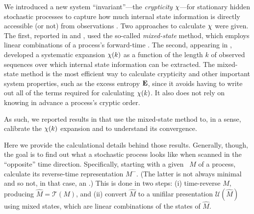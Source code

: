 \documentclass[prl,twocolumn,showpacs,superscriptaddress,preprintnumbers,floatfix]{revtex4}
\theoremstyle{plain}   \newtheorem{Lem}{Lemma}
\theoremstyle{plain} 	\newtheorem{Cor}{Corollary}
\theoremstyle{plain} 	\newtheorem{The}{Theorem}
\theoremstyle{plain} 	\newtheorem{Prop}{Proposition}
\theoremstyle{plain} 	\newtheorem*{Conj}{Conjecture}
\theoremstyle{plain}	\newtheorem*{Rem}{Remark}
\theoremstyle{plain}	\newtheorem*{Def}{Definition}
\theoremstyle{plain}	\newtheorem*{Not}{Notation}
\begin{document}
We introduced a new system ``invariant''---the \emph{crypticity} $\chi$---for
stationary hidden stochastic processes to capture how much internal state
information is directly accessible (or not) from observations
\cite{Crut08a,Crut08b,Maho09a}. Two approaches to calculate $\chi$ were given.
The first, reported in  and , used the
so-called \emph{mixed-state} method, which employs linear combinations of a
process's forward-time \eM. The second, appearing in ,
developed a systematic expansion $\chi(k)$ as a function of the length $k$ of
observed sequences over which internal state information can be extracted.
The mixed-state method is the most efficient way to calculate crypticity and
other important system properties, such as the excess entropy ${\bf E}$, since it
avoids having to write out all of the terms required for calculating $\chi(k)$.
It also does not rely on knowing in advance a process's cryptic order.

As such, we reported results in  that use the mixed-state
method to, in a sense, calibrate the $\chi(k)$ expansion and to understand its
convergence.

Here we provide the calculational details behind those results. Generally,
though, the goal is to
find out what a stochastic process looks like when scanned in the ``opposite''
time direction. Specifically, starting with a given \eM\ $M$ of a process,
calculate its reverse-time representation $M^-$. (The latter is not always
minimal and so not, in that case, an \eM.) This is done in two steps: (i)
time-reverse $M$, producing $\widehat{M} = \mathcal{T}(M)$, and (ii) convert
$\widehat{M}$ to a unifilar presentation $\mathcal{U}(\widehat{M})$ using mixed
states, which are linear combinations of the states of $\widehat{M}$.
\end{document}
